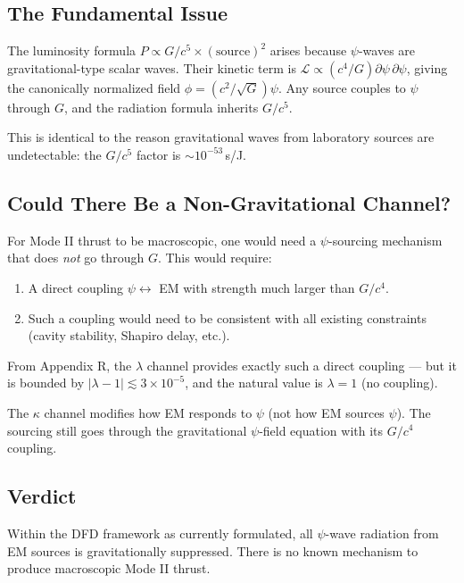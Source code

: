 \documentclass[11pt]{article}
\begin{document}
\subsection{The Fundamental Issue}

The luminosity formula $P \propto G/c^5 \times (\text{source})^2$ arises
because $\psi$-waves are gravitational-type scalar waves. Their kinetic
term is $\mathcal{L} \propto (c^4/G)\partial\psi\,\partial\psi$, giving
the canonically normalized field $\phi = (c^2/\sqrt{G})\psi$. Any source
couples to $\psi$ through $G$, and the radiation formula inherits $G/c^5$.

This is identical to the reason gravitational waves from laboratory
sources are undetectable: the $G/c^5$ factor is $\sim 10^{-53}$\,s/J.

\subsection{Could There Be a Non-Gravitational Channel?}

For Mode II thrust to be macroscopic, one would need a $\psi$-sourcing
mechanism that does \emph{not} go through $G$. This would require:
\begin{enumerate}
\item A direct coupling $\psi \leftrightarrow$ EM with strength much
  larger than $G/c^4$.
\item Such a coupling would need to be consistent with all existing
  constraints (cavity stability, Shapiro delay, etc.).
\end{enumerate}

From Appendix R, the $\lambda$ channel provides exactly such a direct
coupling --- but it is bounded by $|\lambda - 1| \lesssim 3 \times 10^{-5}$,
and the natural value is $\lambda = 1$ (no coupling).

The $\kappa$ channel modifies how EM responds to $\psi$ (not how EM
sources $\psi$). The sourcing still goes through the gravitational
$\psi$-field equation with its $G/c^4$ coupling.

\subsection{Verdict}

Within the DFD framework as currently formulated, all $\psi$-wave
radiation from EM sources is gravitationally suppressed. There is no
known mechanism to produce macroscopic Mode II thrust.

\end{document}
